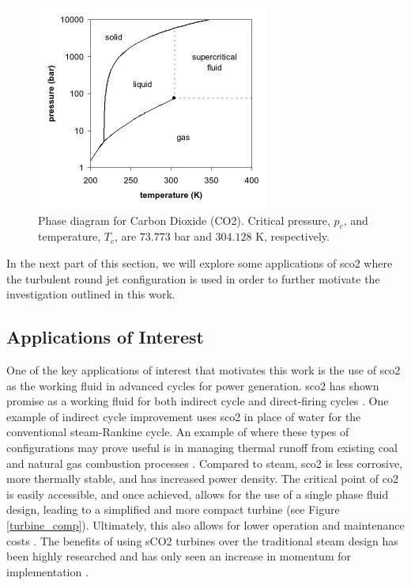 \begin{figure}[h!]
\begin{center}
\includegraphics[scale=.75]{figures/co2_phase_diagram}
\end{center}
\caption{Phase diagram for Carbon Dioxide (CO2). Critical pressure, $p_c$, and temperature, $T_c$, are $73.773$ bar and $304.128$ K, respectively.}
\label{phase_diagram}
\end{figure}

In the next part of this section, we will explore some applications of \gls{sco2} where the turbulent round jet configuration is used in order to further motivate the investigation outlined in this work. 

\subsection{Applications of Interest}
One of the key applications of interest that motivates this work is the use of \gls{sco2} as the working fluid in advanced cycles for power generation. \gls{sco2} has shown promise as a working fluid for both indirect cycle and direct-firing cycles \cite{WEILAND2017293, WHITE2021116447}. One example of indirect cycle improvement uses \gls{sco2} in place of water for the conventional steam-Rankine cycle. An example of where these types of configurations may prove useful is in managing thermal runoff from existing coal and natural gas combustion processes \cite{WEILAND2017293}. Compared to steam, \gls{sco2} is less corrosive, more thermally stable, and has increased power density. The critical point of \gls{co2} is easily accessible, and once achieved, allows for the use of a single phase fluid design, leading to a simplified and more compact turbine (see Figure \ref{turbine_comp}). Ultimately, this also allows for lower operation and maintenance costs \cite{Dodge}. The benefits of using sCO2 turbines over the traditional steam design has been highly researched and has only seen an increase in momentum for implementation \cite{CRESPI2017152, NextGenNucReac, Dodge, commercialization}. 


